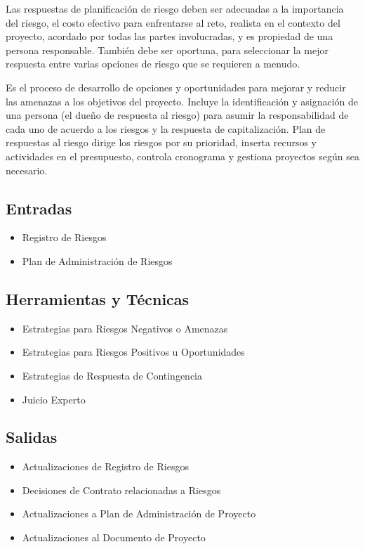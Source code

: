 Las respuestas de planificación de riesgo deben ser adecuadas a la importancia del riesgo, el costo efectivo para enfrentarse al reto, realista en el contexto del proyecto, acordado por todas las partes involucradas, y es propiedad de una persona responsable. También debe ser oportuna, para seleccionar la mejor respuesta entre varias opciones de riesgo que se requieren a menudo.

Es el proceso de desarrollo de opciones y oportunidades para mejorar y reducir las amenazas a los objetivos del proyecto. Incluye la identificación y asignación de una persona (el dueño de respuesta al riesgo) para asumir la responsabilidad de cada uno de acuerdo a los riesgos y la respuesta de capitalización. Plan de respuestas al riesgo dirige los riesgos por su prioridad, inserta recursos y actividades en el presupuesto, controla cronograma y gestiona proyectos según sea necesario.

\subsection{Entradas}

\begin{itemize}
	\item Registro de Riesgos
	\item Plan de Administración de Riesgos
\end{itemize}

\subsection{Herramientas y Técnicas}

\begin{itemize}
	\item Estrategias para Riesgos Negativos o Amenazas
	\item Estrategias para Riesgos Positivos u Oportunidades
	\item Estrategias de Respuesta de Contingencia
	\item Juicio Experto
\end{itemize}

\subsection{Salidas}

\begin{itemize}
	\item Actualizaciones de Registro de Riesgos
	\item Decisiones de Contrato relacionadas a Riesgos
	\item Actualizaciones a Plan de Administración de Proyecto
	\item Actualizaciones al Documento de Proyecto
\end{itemize}

